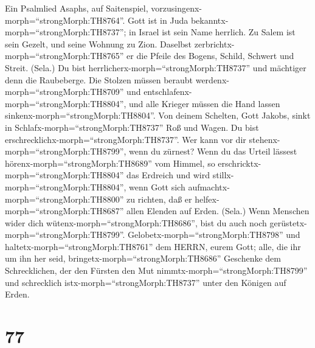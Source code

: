 Ein Psalmlied Asaphs, auf Saitenspiel,
vorzusingenx-morph=``strongMorph:TH8764''. Gott ist in Juda
bekanntx-morph=``strongMorph:TH8737''; in Israel ist sein Name herrlich.
 Zu Salem ist sein Gezelt, und seine Wohnung zu Zion.
 Daselbst zerbrichtx-morph=``strongMorph:TH8765'' er die
Pfeile des Bogens, Schild, Schwert und Streit. (Sela.)  Du
bist herrlicherx-morph=``strongMorph:TH8737'' und mächtiger denn die
Raubeberge.  Die Stolzen müssen beraubt
werdenx-morph=``strongMorph:TH8709'' und
entschlafenx-morph=``strongMorph:TH8804'', und alle Krieger müssen die
Hand lassen sinkenx-morph=``strongMorph:TH8804''.  Von
deinem Schelten, Gott Jakobs, sinkt in
Schlafx-morph=``strongMorph:TH8737'' Roß und Wagen.  Du bist
erschrecklichx-morph=``strongMorph:TH8737''. Wer kann vor dir
stehenx-morph=``strongMorph:TH8799'', wenn du zürnest?  Wenn
du das Urteil lässest hörenx-morph=``strongMorph:TH8689'' vom Himmel, so
erschricktx-morph=``strongMorph:TH8804'' das Erdreich und wird
stillx-morph=``strongMorph:TH8804'',  wenn Gott sich
aufmachtx-morph=``strongMorph:TH8800'' zu richten, daß er
helfex-morph=``strongMorph:TH8687'' allen Elenden auf Erden. (Sela.)
 Wenn Menschen wider dich
wütenx-morph=``strongMorph:TH8686'', bist du auch noch
gerüstetx-morph=``strongMorph:TH8799''. 
Gelobetx-morph=``strongMorph:TH8798'' und
haltetx-morph=``strongMorph:TH8761'' dem HERRN, eurem Gott; alle, die
ihr um ihn her seid, bringetx-morph=``strongMorph:TH8686'' Geschenke dem
Schrecklichen,  der den Fürsten den Mut
nimmtx-morph=``strongMorph:TH8799'' und schrecklich
istx-morph=``strongMorph:TH8737'' unter den Königen auf Erden.

\hypertarget{section-76}{%
\section{77}\label{section-76}}

